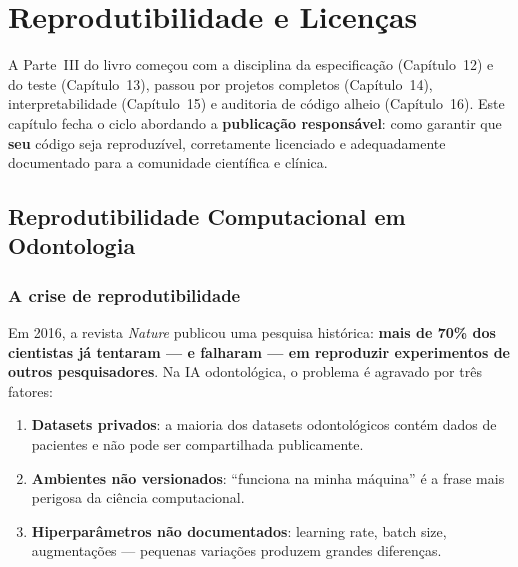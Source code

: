 \chapter{Reprodutibilidade e Licenças}
\label{cap:reprodutibilidade}
\nivelquatro

A Parte~III do livro começou com a disciplina da especificação (Capítulo~12)
e do teste (Capítulo~13), passou por projetos completos (Capítulo~14),
interpretabilidade (Capítulo~15) e auditoria de código alheio
(Capítulo~16). Este capítulo fecha o ciclo abordando a \textbf{publicação
responsável}: como garantir que \textbf{seu} código seja reproduzível,
corretamente licenciado e adequadamente documentado para a comunidade
científica e clínica.

\section{Reprodutibilidade Computacional em Odontologia}

\subsection{A crise de reprodutibilidade}

Em 2016, a revista \textit{Nature} publicou uma pesquisa histórica:
\textbf{mais de 70\% dos cientistas já tentaram — e falharam — em
reproduzir experimentos de outros pesquisadores}. Na IA odontológica,
o problema é agravado por três fatores:

\begin{enumerate}
  \item \textbf{Datasets privados}: a maioria dos datasets odontológicos
    contém dados de pacientes e não pode ser compartilhada publicamente.
  \item \textbf{Ambientes não versionados}: ``funciona na minha máquina''
    é a frase mais perigosa da ciência computacional.
  \item \textbf{Hiperparâmetros não documentados}: learning rate, batch
    size, augmentações — pequenas variações produzem grandes diferenças.
\end{enumerate}


